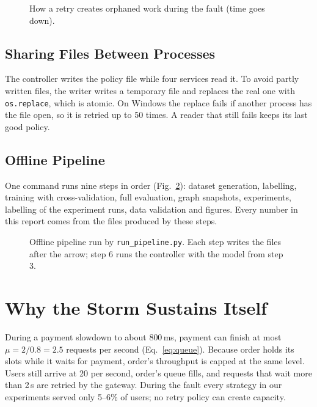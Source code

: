 \documentclass[conference,a4paper]{IEEEtran}
\begin{document}
\begin{figure}[!t]
\centering
\resizebox{\columnwidth}{!}{}
\caption{How a retry creates orphaned work during the fault (time goes down).}
\label{fig:seq}
\end{figure}

\subsection{Sharing Files Between Processes}
The controller writes the policy file while four services read it. To avoid partly written files, the writer writes a temporary file and replaces the real one with \texttt{os.replace}, which is atomic. On Windows the replace fails if another process has the file open, so it is retried up to 50 times. A reader that still fails keeps its last good policy.

\subsection{Offline Pipeline}
One command runs nine steps in order (Fig.~\ref{fig:pipe}): dataset generation, labelling, training with cross-validation, full evaluation, graph snapshots, experiments, labelling of the experiment runs, data validation and figures. Every number in this report comes from the files produced by these steps.

\begin{figure}[!t]
\centering

\caption{Offline pipeline run by \texttt{run\_pipeline.py}. Each step writes the files after the arrow; step 6 runs the controller with the model from step 3.}
\label{fig:pipe}
\end{figure}

\section{Why the Storm Sustains Itself}
\label{sec:mech}

During a payment slowdown to about 800\,ms, payment can finish at most $\mu = 2/0.8 = 2.5$ requests per second (Eq.~\ref{eq:queue}). Because order holds its slots while it waits for payment, order's throughput is capped at the same level. Users still arrive at 20 per second, order's queue fills, and requests that wait more than 2\,s are retried by the gateway. During the fault every strategy in our experiments served only 5--6\% of users; no retry policy can create capacity.
\end{document}
